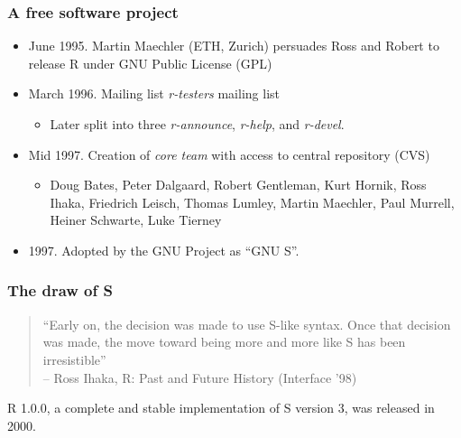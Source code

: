\documentclass[svgnames]{beamer}
\begin{document}
\begin{frame}
  \frametitle{A free software project}

  \begin{itemize}
  \item June 1995. Martin Maechler (ETH, Zurich) persuades Ross and
    Robert to release R under GNU Public License (GPL)
  \item March 1996. Mailing list {\em r-testers} mailing list
    \begin{itemize}
    \item Later split into three {\em r-announce}, {\em r-help}, and
      {\em r-devel}.
    \end{itemize}
  \item Mid 1997. Creation of {\em core team} with access to central
    repository (CVS)
    \begin{itemize}
    \item {\small Doug Bates, Peter Dalgaard, Robert Gentleman, Kurt
      Hornik, Ross Ihaka, Friedrich Leisch, Thomas Lumley, Martin
      Maechler, Paul Murrell, Heiner Schwarte, Luke Tierney}
    \end{itemize}
  \item 1997. Adopted by the GNU Project as ``GNU S''. 
  \end{itemize}
\end{frame}
  
\begin{frame}
  \frametitle{The draw of S}

  \begin{quote}
    ``Early on, the decision was made to use S-like syntax. Once that
    decision was made, the move toward being more and more like S has
    been irresistible''\\
    -- Ross Ihaka, R: Past and Future History
    (Interface '98)
  \end{quote}

  R 1.0.0, a complete and stable implementation of S version 3, was
  released in 2000.

\end{frame}
\end{document}
